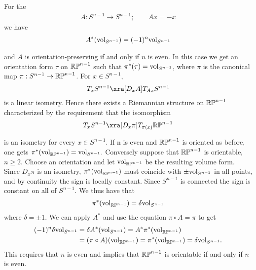 \begin{example}\label{example:9-19}
  For the  
  \begin{align*}
    A:S^{n-1} \to S^{n-1}; \qquad Ax = -x 
  \end{align*}
  we have 
  \begin{align*}
    A^*(\mathrm{vol}_{S^{n-1}}) = (-1)^n \mathrm{vol}_{S^{n-1}}
  \end{align*}

  and $A$ is orientation-preserving if and only if $n$ is even. In this case we get an
  orientation form $\tau$ on $\mathbb{RP}^{n-1}$ such that $\pi^*(\tau) = \mathrm{vol}_{S^{n-1}}$,
  where $\pi$ is the canonical map $\pi:S^{n-1}\to\mathbb{RP}^{n-1}$. For $x\in S^{n-1}$,
  \begin{align*}
    T_xS^{n-1} \xra[D_xA] T_{Ax} S^{n-1}
  \end{align*}
  is a linear isometry. Hence there exists a Riemannian structure on $\mathbb{RP}^{n-1}$
  characterized by the requirement that the isomorphism
  \begin{align*}
    T_xS^{n-1} \xra[D_x\pi] T_{\pi (x)} \B{RP}^{n-1}
  \end{align*}

  is an isometry for every $x\in S^{n-1}$. If n is even and $\mathbb{RP}^{n-1}$ is oriented as before,
  one gets $\pi^*(\mathrm{vol}_{\mathbb{RP}^{n-1}}) = \mathrm{vol}_{S^{n-1}}$. Conversely suppose that $\mathbb{RP}^{n-1}$ 
  is orientable, $n\ge 2$. Choose an orientation and let $\mathrm{vol}_{\mathbb{RP}^{n-1}}$ be the resulting volume form. Since
  $D_x\pi$ is an isometry, $\pi^*(\mathrm{vol}_{\mathbb{RP}^{n-1}})$ must coincide with $\pm\mathrm{vol}_{S^{n-1}}$ in all points, 
  and by continuity the sign is locally constant. Since $S^{n-1}$ is connected the sign is
  constant on all of $S^{n-1}$. We thus have that
  \begin{align*}
    \pi^*(\mathrm{vol}_{\mathbb{RP}^{n-1}})
    = \delta\mathrm{vol}_{S^{n-1}}
  \end{align*}
  where $\delta=\pm 1$. We can apply $A^*$ and use the equation $\pi\circ A =\pi$ to get 
  \begin{align*}
    (-1)^n \delta\mathrm{vol}_{S^{n-1}} 
    & = \delta A^*(\mathrm{vol}_{S^{n-1}})
        = A^*\pi^*(\mathrm{vol}_{\mathbb{RP}^{n-1}}) \\
    & = (\pi\circ A)(\mathrm{vol}_{\mathbb{RP}^{n-1}}) 
        = \pi^*(\mathrm{vol}_{\mathbb{RP}^{n-1}}) 
        = \delta \mathrm{vol}_{S^{n-1}}.
  \end{align*}
  This requires that $n$ is even and implies that $\mathbb{RP}^{n-1}$ is orientable if and only if
  $n$ is even.
\end{example}


